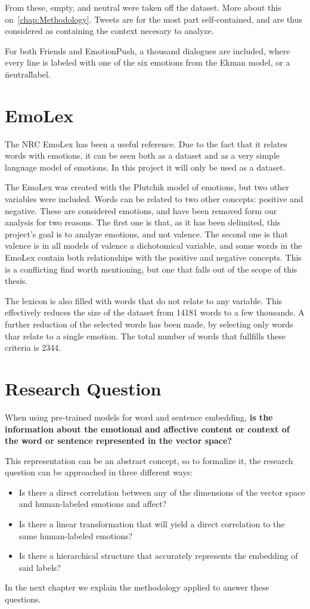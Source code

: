From these, empty, and neutral were taken off the dataset. More about this on~\ref{chap:Methodology}. Tweets are for the most part self-contained, and are thus considered as containing the context necesary to analyze.

For both Friends and EmotionPush, a thousand dialogues are included, where every line is labeled with one of the six emotions from the Ekman model, or a \"neutral\" label.

\section{EmoLex}\label{sec:Research Question}
The NRC EmoLex has been a useful reference. Due to the fact that it relates words with emotions, it can be seen both as a dataset and as a very simple language model of emotions. In this project it will only be used as a dataset.

The EmoLex was created with the Plutchik model of emotions, but two other variables were included. Words can be related to two other concepts: positive and negative. These are considered emotions, and have been removed form our analysis for two reasons. The first one is that, as it has been delimited, this project's goal is to analyze emotions, and not valence. The second one is that valence is in all models of valence a dichotomical variable, and some words in the EmoLex contain both relationships with the positive and negative concepts. This is a conflicting find worth mentioning, but one that falls out of the scope of this thesis.

The lexicon is also filled with words that do not relate to any variable. This effectively reduces the size of the dataset from 14181 words to a few thousands. A further reduction of the selected words has been made, by selecting only words thar relate to a single emotion. The total number of words that fullfills these criteria is 2344.

\section{Research Question}\label{sec:Research Question}
When using pre-trained models for word and sentence embedding, \textbf{is the information about the emotional and affective content or context of the word or sentence represented in the vector space?}

This representation can be an abstract concept, so to formalize it, the research question can be approached in three different ways:

\begin{itemize}
  \item Is there a direct correlation between any of the dimensions of the vector space and human-labeled emotions and affect?
  \item Is there a linear transformation that will yield a direct correlation to the same human-labeled emotions?
  \item Is there a hierarchical structure that accurately represents the embedding of said labels?
\end{itemize}

In the next chapter we explain the methodology applied to answer these questions.
